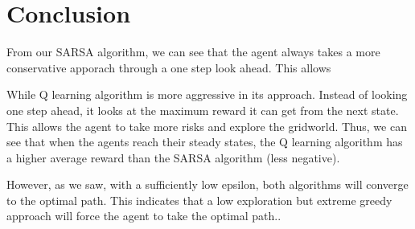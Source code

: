 \documentclass{article}
\begin{document}
\section*{Conclusion}

From our SARSA algorithm, we can see that the agent always takes a more
conservative apporach through a one step look ahead. This allows

While Q learning algorithm is more aggressive in its approach. Instead of
looking one step ahead, it looks at the maximum reward it can get from the
next state. This allows the agent to take more risks and explore the gridworld.
Thus, we can see that when the agents reach their steady states, the Q learning
algorithm has a higher average reward than the SARSA algorithm (less negative).

However, as we saw, with a sufficiently low epsilon, both algorithms will
converge to the optimal path. This indicates that a low exploration but extreme
greedy approach will force the agent to take the optimal path..
\end{document}
